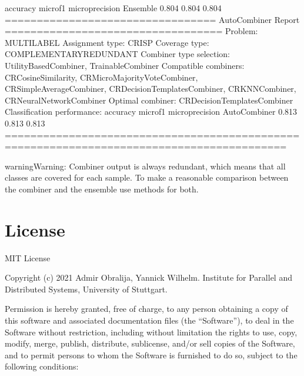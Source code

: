 \documentclass[letterpaper,10pt,english]{sphinxmanual}
\begin{document}
\begin{sphinxVerbatim}[commandchars=\\\{\}]
                                     accuracy  micro\PYGZus{}f1  micro\PYGZus{}precision
Ensemble                                0.804     0.804            0.804
================================= AutoCombiner \PYGZhy{} Report ==================================
                   Problem: MULTI\PYGZus{}LABEL
           Assignment type: CRISP
             Coverage type: COMPLEMENTARY\PYGZus{}REDUNDANT
   Combiner type selection: UtilityBasedCombiner, TrainableCombiner
      Compatible combiners: CRCosineSimilarity, CRMicroMajorityVoteCombiner, CRSimpleAverageCombiner, CRDecisionTemplatesCombiner, CRKNNCombiner, CRNeuralNetworkCombiner
          Optimal combiner: CRDecisionTemplatesCombiner
Classification performance:
                                     accuracy  micro\PYGZus{}f1  micro\PYGZus{}precision
AutoCombiner                            0.813     0.813            0.813
==========================================================================================
\end{sphinxVerbatim}

\begin{sphinxadmonition}{warning}{Warning:}
\sphinxAtStartPar
Combiner output is always redundant, which means that all classes are covered for each sample.
To make a reasonable comparison between the combiner and the ensemble use  methods for both.
\end{sphinxadmonition}


\chapter{License}
\label{\detokenize{license:license}}\label{\detokenize{license::doc}}
\sphinxAtStartPar
MIT License

\sphinxAtStartPar
Copyright (c) 2021 Admir Obralija, Yannick Wilhelm.
Institute for Parallel and Distributed Systems, University of Stuttgart.

\sphinxAtStartPar
Permission is hereby granted, free of charge, to any person obtaining a copy
of this software and associated documentation files (the “Software”), to deal
in the Software without restriction, including without limitation the rights
to use, copy, modify, merge, publish, distribute, sublicense, and/or sell
copies of the Software, and to permit persons to whom the Software is
furnished to do so, subject to the following conditions:
\end{document}
